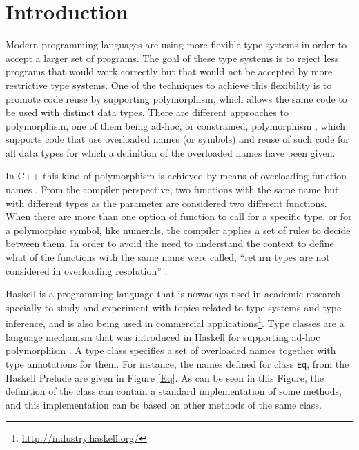 \documentclass[msc]{ppgccufmg}
\begin{document}

\chapter{Introduction}
Modern programming languages are using more flexible type systems in order to accept a larger set of programs.
The goal of these type systems is to reject less programs that would work correctly but that would not be accepted by more restrictive type systems.
One of the techniques to achieve this flexibility is to promote code reuse by supporting polymorphism, which allows the same code to be used with distinct data types.
There are different approaches to polymorphism, one of them being ad-hoc, or constrained, polymorphism \citep{wadler}, which supports code that use overloaded names (or symbols) and reuse of such code for all data types for which a definition of the overloaded names have been given.

In C++ this kind of polymorphism is achieved by means of overloading function names \citep[section 7.4]{stroustrup}.
From the compiler perspective, two functions with the same name but with different types as the parameter are considered two different functions.
When there are more than one option of function to call for a specific type, or for a polymorphic symbol, like numerals, the compiler applies a set of rules to decide between them.
In order to avoid the need to understand the context to define what of the functions with the same name were called, ``return types are not considered in overloading resolution'' \citep[section 7.4.1]{stroustrup}.

Haskell is a programming language that is nowadays used in academic research specially to study and experiment with topics related to type systems and type inference, and is also being used in commercial applications\footnote{\url{http://industry.haskell.org/}}.
Type classes are a language mechanism that was introduced in Haskell for supporting ad-hoc polymorphism \citep{tch}.
A type class specifies a set of overloaded names together with type annotations for them.
For instance, the names defined for class \texttt{Eq}, from the Haskell Prelude \citep{report} are given in Figure \ref{Eq}.
As can be seen in this Figure, the definition of the class can contain a standard implementation of some methods, and this implementation can be based on other methods of the same class.
\end{document}
